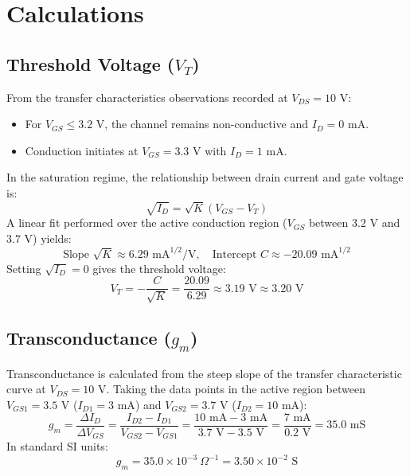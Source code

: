 \documentclass[12pt,a4paper]{article}
\begin{document}
\section{Calculations}

\subsection{Threshold Voltage ($V_T$)}
From the transfer characteristics observations recorded at $V_{DS} = 10\text{ V}$:
\begin{itemize}
    \item For $V_{GS} \le 3.2\text{ V}$, the channel remains non-conductive and $I_D = 0\text{ mA}$.
    \item Conduction initiates at $V_{GS} = 3.3\text{ V}$ with $I_D = 1\text{ mA}$.
\end{itemize}
In the saturation regime, the relationship between drain current and gate voltage is:
\begin{equation}
    \sqrt{I_D} = \sqrt{K} (V_{GS} - V_T)
\end{equation}
A linear fit performed over the active conduction region ($V_{GS}$ between $3.2\text{ V}$ and $3.7\text{ V}$) yields:
\begin{equation}
    \text{Slope } \sqrt{K} \approx 6.29\text{ mA}^{1/2}/\text{V}, \quad \text{Intercept } C \approx -20.09\text{ mA}^{1/2}
\end{equation}
Setting $\sqrt{I_D} = 0$ gives the threshold voltage:
\begin{equation}
    V_T = -\frac{C}{\sqrt{K}} = \frac{20.09}{6.29} \approx 3.19\text{ V} \approx 3.20\text{ V}
\end{equation}

\subsection{Transconductance ($g_m$)}
Transconductance is calculated from the steep slope of the transfer characteristic curve at $V_{DS} = 10\text{ V}$. Taking the data points in the active region between $V_{GS1} = 3.5\text{ V}$ ($I_{D1} = 3\text{ mA}$) and $V_{GS2} = 3.7\text{ V}$ ($I_{D2} = 10\text{ mA}$):
\begin{equation}
    g_m = \frac{\Delta I_D}{\Delta V_{GS}} = \frac{I_{D2} - I_{D1}}{V_{GS2} - V_{GS1}} = \frac{10\text{ mA} - 3\text{ mA}}{3.7\text{ V} - 3.5\text{ V}} = \frac{7\text{ mA}}{0.2\text{ V}} = 35.0\text{ mS}
\end{equation}
In standard SI units:
\begin{equation}
    g_m = 35.0 \times 10^{-3}\ \Omega^{-1} = 3.50 \times 10^{-2}\text{ S}
\end{equation}
\end{document}
